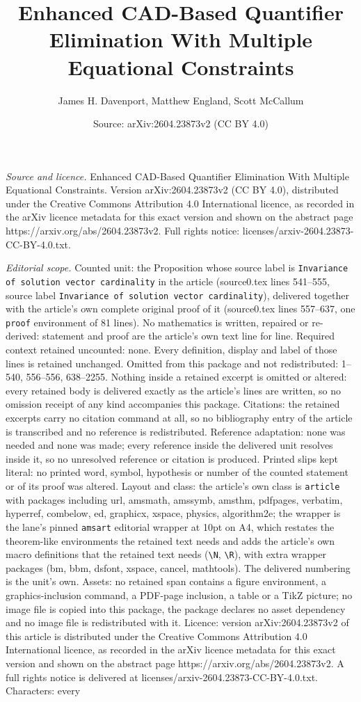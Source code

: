 \documentclass[10pt,a4paper]{amsart}
\title[Enhanced CAD-Based Quantifier Elimination With Multiple Equa]{Enhanced CAD-Based Quantifier Elimination With Multiple Equational Constraints}
\author{James H. Davenport, Matthew England, Scott McCallum}
\date{Source: arXiv:2604.23873v2 (CC BY 4.0)}
\begin{document}
\maketitle

\noindent\emph{Source and licence.} Enhanced CAD-Based Quantifier Elimination With Multiple Equational Constraints. Version arXiv:2604.23873v2 (CC BY 4.0), distributed under the Creative Commons Attribution 4.0 International licence, as recorded in the arXiv licence metadata for this exact version and shown on the abstract page https://arxiv.org/abs/2604.23873v2. Full rights notice: licenses/arxiv-2604.23873-CC-BY-4.0.txt.\par\smallskip

\noindent\textit{Editorial scope.} Counted unit: the Proposition whose source label is \texttt{Invariance of solution vector cardinality} in the article (source0.tex lines 541--555, source label \texttt{Invariance of solution vector cardinality}), delivered together with the article's own complete original proof of it (source0.tex lines 557--637, one \texttt{proof} environment of 81 lines). No mathematics is written, repaired or re-derived: statement and proof are the article's own text line for line. Required context retained uncounted: none. Every definition, display and label of those lines is retained unchanged. Omitted from this package and not redistributed: 1--540, 556--556, 638--2255. Nothing inside a retained excerpt is omitted or altered: every retained body is delivered exactly as the article's lines are written, so no omission receipt of any kind accompanies this package. Citations: the retained excerpts carry no citation command at all, so no bibliography entry of the article is transcribed and no reference is redistributed. Reference adaptation: none was needed and none was made; every reference inside the delivered unit resolves inside it, so no unresolved reference or citation is produced. Printed slips kept literal: no printed word, symbol, hypothesis or number of the counted statement or of its proof was altered. Layout and class: the article's own class is \texttt{article} with packages including url, amsmath, amssymb, amsthm, pdfpages, verbatim, hyperref, combelow, ed, graphicx, xspace, physics, algorithm2e; the wrapper is the lane's pinned \texttt{amsart} editorial wrapper at 10pt on A4, which restates the theorem-like environments the retained text needs and adds the article's own macro definitions that the retained text needs (\texttt{\textbackslash N}, \texttt{\textbackslash R}), with extra wrapper packages (bm, bbm, dsfont, xspace, cancel, mathtools). The delivered numbering is the unit's own. Assets: no retained span contains a figure environment, a graphics-inclusion command, a PDF-page inclusion, a table or a TikZ picture; no image file is copied into this package, the package declares no asset dependency and no image file is redistributed with it. Licence: version arXiv:2604.23873v2 of this article is distributed under the Creative Commons Attribution 4.0 International licence, as recorded in the arXiv licence metadata for this exact version and shown on the abstract page https://arxiv.org/abs/2604.23873v2. A full rights notice is delivered at licenses/arxiv-2604.23873-CC-BY-4.0.txt. Characters: every 
\end{document}
